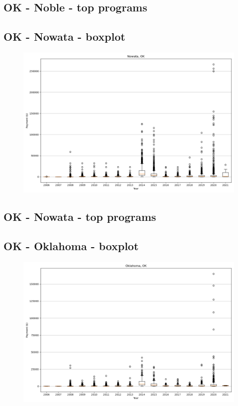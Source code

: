 \subsection*{OK - Noble - top programs}

\newpage
\subsection*{OK - Nowata - boxplot}
\begin{figure}[h]
\centering
\includegraphics[width=7in]{../output/boxplots/counties/Nowata-OK_boxplot.png}
\end{figure}


\subsection*{OK - Nowata - top programs}

\newpage
\subsection*{OK - Oklahoma - boxplot}
\begin{figure}[h]
\centering
\includegraphics[width=7in]{../output/boxplots/counties/Oklahoma-OK_boxplot.png}
\end{figure}



